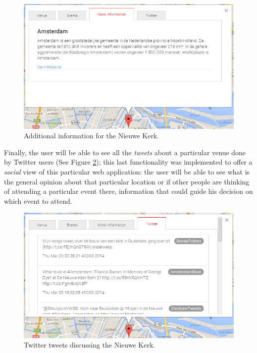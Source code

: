 \documentclass[hidelinks,a4paper]{article}
\begin{document}
\begin{figure}[h!]
  \centering
    \includegraphics[scale=0.48]{images/kerk_more_information.png}    
    \caption{Additional information for the Nieuwe Kerk.}
    \label{fig:kerk_more_information}
\end{figure}

Finally, the user will be able to see all the \textit{tweets} about a particular venue done by Twitter users (See Figure \ref{fig:kerk_tweets}); this last functionality was implemented to offer a \textit{social} view of this particular web application: the user will be able to see what is the general opinion about that particular location or if other people are thinking of attending a particular event there, information that could guide his decision on which event to attend.

\begin{figure}[h!]
  \centering
    \includegraphics[scale=0.48]{images/kerk_tweets.png}    
    \caption{Twitter tweets discussing the Nieuwe Kerk.}
    \label{fig:kerk_tweets}
\end{figure}
\end{document}
